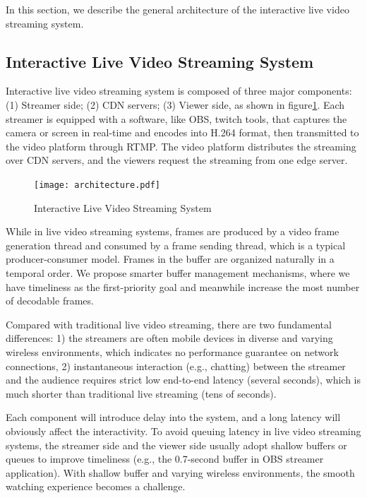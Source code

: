 \iffalse
In this section, we describe the general architecture of the interactive live video streaming system.
\subsection{Interactive Live Video Streaming System}
Interactive live video streaming system is composed of three major components: (1) Streamer side; (2) CDN servers; (3) Viewer side, as shown in figure\ref{fig_architecture}. Each streamer is equipped with a software, like OBS, twitch tools, that captures the camera or screen in real-time and encodes into H.264 format, then transmitted to the video platform through RTMP. The video platform distributes the streaming over CDN servers, and the viewers request the streaming from one edge server.

\begin{figure}[t]
\centering
\texttt{[image: architecture.pdf]}
\vspace{-0.08in}
\caption{Interactive Live Video Streaming System}
\vspace{-0.1in}
\label{fig_architecture}
\end{figure}

While in live video streaming systems, frames are produced by a video frame generation thread and consumed by a frame sending thread, which is a typical producer-consumer model. Frames in the buffer are organized naturally in a temporal order. We propose smarter buffer management mechanisms, where we have timeliness as the first-priority goal and meanwhile increase the most number of decodable frames.

Compared with traditional live video streaming, there are two fundamental differences: 1) the streamers are often mobile devices in diverse and varying wireless environments, which indicates no performance guarantee on network connections, 2) instantaneous interaction (e.g., chatting) between the streamer and the audience requires strict low end-to-end latency (several seconds), which is much shorter than traditional live streaming (tens of seconds).

Each component will introduce delay into the system, and a long latency will obviously affect the interactivity. To avoid queuing latency in live video streaming systems, the streamer side and the viewer side usually adopt shallow buffers or queues to improve timeliness (e.g., the 0.7-second buffer in OBS streamer application).
With shallow buffer and varying wireless environments, the smooth watching experience becomes a challenge.

